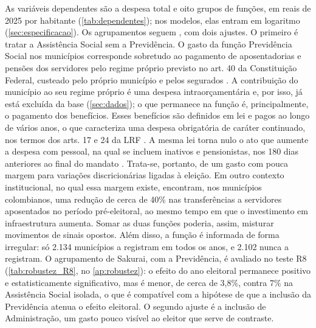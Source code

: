 As variáveis dependentes são a despesa total e oito grupos de funções, em reais de 2025 por habitante (\autoref{tab:dependentes}); nos modelos, elas entram em logaritmo (\autoref{sec:especificacao}). Os agrupamentos seguem \textcite{sakurai2009}, com dois ajustes. O primeiro é tratar a Assistência Social sem a Previdência. O gasto da função Previdência Social nos municípios corresponde sobretudo ao pagamento de aposentadorias e pensões dos servidores pelo regime próprio previsto no art. 40 da Constituição Federal, custeado pelo próprio município e pelos segurados \parencite[art.~40]{cf1988}. A contribuição do município ao seu regime próprio é uma despesa intraorçamentária \parencite[p.~449]{mcasp2024} e, por isso, já está excluída da base (\autoref{sec:dados}); o que permanece na função é, principalmente, o pagamento dos benefícios. Esses benefícios são definidos em lei e pagos ao longo de vários anos, o que caracteriza uma despesa obrigatória de caráter continuado, nos termos dos arts. 17 e 24 da LRF \parencite[arts.~17 e~24, §~2º]{lrf2000}. A mesma lei torna nulo o ato que aumente a despesa com pessoal, na qual se incluem inativos e pensionistas, nos 180 dias anteriores ao final do mandato \parencite[arts.~18 e~21, II]{lrf2000}. Trata-se, portanto, de um gasto com pouca margem para variações discricionárias ligadas à eleição. Em outro contexto institucional, no qual essa margem existe, \textcite{drazen2010} encontram, nos municípios colombianos, uma redução de cerca de 40\% nas transferências a servidores aposentados no período pré-eleitoral, ao mesmo tempo em que o investimento em infraestrutura aumenta. Somar as duas funções poderia, assim, misturar movimentos de sinais opostos. Além disso, a função é informada de forma irregular: só 2.134 municípios a registram em todos os anos, e 2.102 nunca a registram. O agrupamento de Sakurai, com a Previdência, é avaliado no teste R8 (\autoref{tab:robustez_R8}, no \autoref{ap:robustez}): o efeito do ano eleitoral permanece positivo e estatisticamente significativo, mas é menor, de cerca de 3,8\%, contra 7\% na Assistência Social isolada, o que é compatível com a hipótese de que a inclusão da Previdência atenua o efeito eleitoral. O segundo ajuste é a inclusão de Administração, um gasto pouco visível ao eleitor que serve de contraste.


